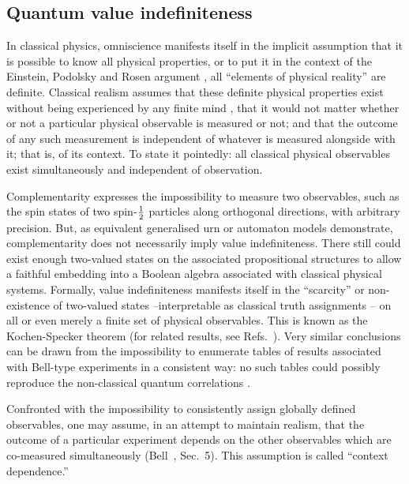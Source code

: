 \documentclass[pra,amsfonts,preprint,showkeys]{revtex4}
\begin{document}
\subsection{Quantum value indefiniteness}


In classical physics, omniscience
manifests itself in the implicit assumption that
it is possible to know all physical properties, or to put it in the
context of the Einstein, Podolsky and Rosen argument \cite{epr},
all ``elements of physical reality'' are definite.
Classical realism assumes that these definite physical properties exist
without being experienced by any finite mind \cite{stace},
that it would not matter whether or not a particular physical observable
is measured or not; and that the outcome of any such measurement is independent of
whatever is measured alongside with it; that is, of its context.
To state it pointedly: all classical physical observables exist
simultaneously and independent of observation.

Complementarity expresses the impossibility to measure two observables,
such as the spin states of two spin-${1\over 2}$ particles
along orthogonal directions, with arbitrary precision.
But, as equivalent \cite{svozil-2001-eua} generalised urn \cite{wright}
or automaton models \cite{svozil-ql} demonstrate,
complementarity does not necessarily imply value indefiniteness.
There still could exist enough two-valued states on the associated propositional
structures to allow a faithful embedding into a Boolean algebra associated with classical physical systems.
Formally, value indefiniteness manifests itself in the ``scarcity'' or non-existence of
two-valued states --interpretable as classical truth assignments -- on all
or even merely a finite set of physical observables.
This is known as the Kochen-Specker theorem
\cite{kochen1} (for related results, see Refs.~\cite{ZirlSchl-65,Alda,Alda2,kamber64,kamber65}).
Very similar conclusions can be drawn from the impossibility to enumerate tables of results
associated with Bell-type experiments in a consistent way: no such tables could possibly reproduce
the non-classical quantum correlations \cite{peres222,krenn,svozil-krenn}.


Confronted with the impossibility to consistently assign globally defined
observables, one may assume, in an attempt to maintain realism, that the outcome of a particular experiment
depends on the other observables which are co-measured simultaneously (Bell~\cite{bell-66}, Sec.~5).
This assumption is called ``context dependence.''
\end{document}
